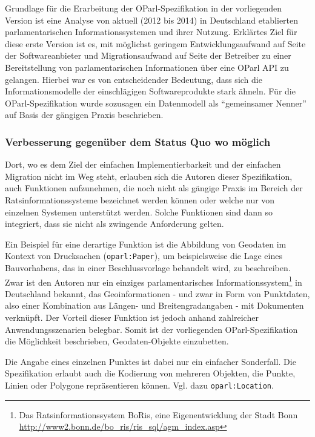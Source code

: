 \documentclass[,a4paper]{article}
\begin{document}
Grundlage für die Erarbeitung der OParl-Spezifikation in der
vorliegenden Version ist eine Analyse von aktuell (2012 bis 2014) in
Deutschland etablierten parlamentarischen Informationssystemen und ihrer
Nutzung. Erklärtes Ziel für diese erste Version ist es, mit möglichst
geringem Entwicklungsaufwand auf Seite der Softwareanbieter und
Migrationsaufwand auf Seite der Betreiber zu einer Bereitstellung von
parlamentarischen Informationen über eine OParl API zu gelangen. Hierbei
war es von entscheidender Bedeutung, dass sich die Informationsmodelle
der einschlägigen Softwareprodukte stark ähneln. Für die
OParl-Spezifikation wurde sozusagen ein Datenmodell als ``gemeinsamer
Nenner'' auf Basis der gängigen Praxis beschrieben.

\subsubsection{Verbesserung gegenüber dem Status Quo wo
möglich}\label{verbesserung-gegenuxfcber-dem-status-quo-wo-muxf6glich}

Dort, wo es dem Ziel der einfachen Implementierbarkeit und der einfachen
Migration nicht im Weg steht, erlauben sich die Autoren dieser
Spezifikation, auch Funktionen aufzunehmen, die noch nicht als gängige
Praxis im Bereich der Ratsinformationssysteme bezeichnet werden können
oder welche nur von einzelnen Systemen unterstützt werden. Solche
Funktionen sind dann so integriert, dass sie nicht als zwingende
Anforderung gelten.

Ein Beispiel für eine derartige Funktion ist die Abbildung von Geodaten
im Kontext von Drucksachen (\texttt{oparl:Paper}), um beispielsweise die
Lage eines Bauvorhabens, das in einer Beschlussvorlage behandelt wird,
zu beschreiben. Zwar ist den Autoren nur ein einziges parlamentarisches
Informationssystem\footnote{Das Ratsinformationssystem BoRis, eine
  Eigenentwicklung der Stadt Bonn
  \url{http://www2.bonn.de/bo_ris/ris_sql/agm_index.asp}} in Deutschland
bekannt, das Geoinformationen - und zwar in Form von Punktdaten, also
einer Kombination aus Längen- und Breitengradangaben - mit Dokumenten
verknüpft. Der Vorteil dieser Funktion ist jedoch anhand zahlreicher
Anwendungsszenarien belegbar. Somit ist der vorliegenden
OParl-Spezifikation die Möglichkeit beschrieben, Geodaten-Objekte
einzubetten.

Die Angabe eines einzelnen Punktes ist dabei nur ein einfacher
Sonderfall. Die Spezifikation erlaubt auch die Kodierung von mehreren
Objekten, die Punkte, Linien oder Polygone repräsentieren können. Vgl.
dazu \texttt{oparl:Location}.
\end{document}
